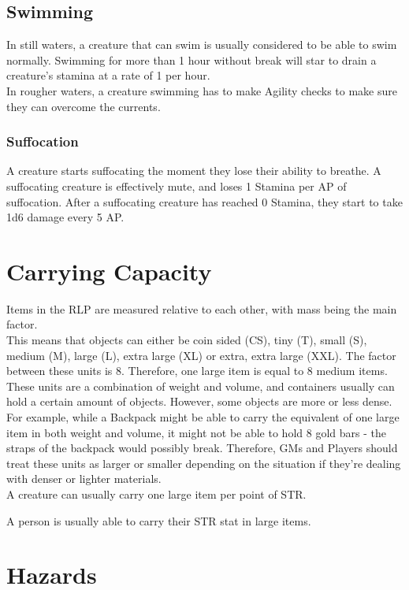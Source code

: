 \subsection{Swimming}\label{subsec:swimming}
In still waters, a creature that can swim is usually considered to be able to swim normally.
Swimming for more than 1 hour without break will star to drain a creature's stamina at a rate of 1 per hour.\\
In rougher waters, a creature swimming has to make Agility checks to make sure they can overcome the currents.\\

\subsubsection{Suffocation}\label{subsubsec:suffocation}
A creature starts suffocating the moment they lose their ability to breathe.
A suffocating creature is effectively mute, and loses 1 Stamina per AP of suffocation.
After a suffocating creature has reached 0 Stamina, they start to take 1d6 damage every 5 AP.

\section{Carrying Capacity}\label{sec:carryingCapacity}
Items in the RLP are measured relative to each other, with mass being the main factor.\\
This means that objects can either be coin sided (CS), tiny (T), small (S), medium (M), large (L), extra large (XL) or extra, extra large (XXL).
The factor between these units is 8.
Therefore, one large item is equal to 8 medium items.
These units are a combination of weight and volume, and containers usually can hold a certain amount of objects.
However, some objects are more or less dense.
For example, while a Backpack might be able to carry the equivalent of one large item in both weight and volume, it might not be able to hold 8 gold bars - the straps of the backpack would possibly break.
Therefore, GMs and Players should treat these units as larger or smaller depending on the situation if they're dealing with denser or lighter materials.\\
A creature can usually carry one large item per point of STR.

A person is usually able to carry their STR stat in large items.\\

\section{Hazards}\label{sec:hazards}

